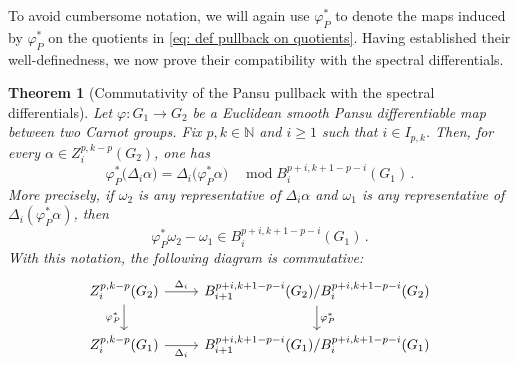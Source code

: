 \documentclass[dvipsnames]{amsart}
\newtheorem{theorem}{Theorem}[section]
\theoremstyle{definition}
\theoremstyle{definition}
\numberwithin{equation}{section}
\newcommand{\R}{\mathbb{R}}
\begin{document}
    


To avoid cumbersome notation, we will again use $\varphi_P^*$ to denote the maps induced by $\varphi_P^*$ on the quotients in \eqref{eq: def pullback on quotients}. 
Having established their well-definedness, we now prove their compatibility with the spectral differentials.

\begin{theorem}[Commutativity of the Pansu pullback with the spectral differentials]
\label{thm: commutativity}
Let $\varphi:G_1\longrightarrow G_2$
be a Euclidean smooth Pansu differentiable map between two Carnot
groups. Fix \(p,k\in\mathbb N\) and \(i\geq1\) such that $i\in I_{p,k}$.
Then, for every $\alpha\in Z_i^{p,k-p}(G_2)$,
one has
\begin{equation}
\label{eq:Pansu-commutativity-mod-Bi}
\varphi_P^*\bigl(\Delta_i\alpha\bigr)
=
\Delta_i\bigl(\varphi_P^*\alpha\bigr)
\quad
\operatorname{mod}
B_i^{p+i,k+1-p-i}(G_1)\,.
\end{equation}
More precisely, if \(\omega_2\) is any representative of
\(\Delta_i\alpha\) and \(\omega_1\) is any representative of
\(\Delta_i(\varphi_P^*\alpha)\), then
\[
\varphi_P^*\omega_2-\omega_1
\in
B_i^{p+i,k+1-p-i}(G_1)\,.
\]
With this notation, the following diagram is commutative:
\[
\begin{tikzcd}
Z_i^{p,k-p}(G_2)
\arrow[r,"\Delta_i"]
\arrow[d,"\varphi_P^*"']
&
B_{i+1}^{p+i,k+1-p-i}(G_2)/
B_i^{p+i,k+1-p-i}(G_2)
\arrow[d,"\varphi_P^*"]
\\
Z_i^{p,k-p}(G_1)
\arrow[r,"\Delta_i"']
&
B_{i+1}^{p+i,k+1-p-i}(G_1)/
B_i^{p+i,k+1-p-i}(G_1)
\end{tikzcd}
\]
\end{theorem}
\end{document}
